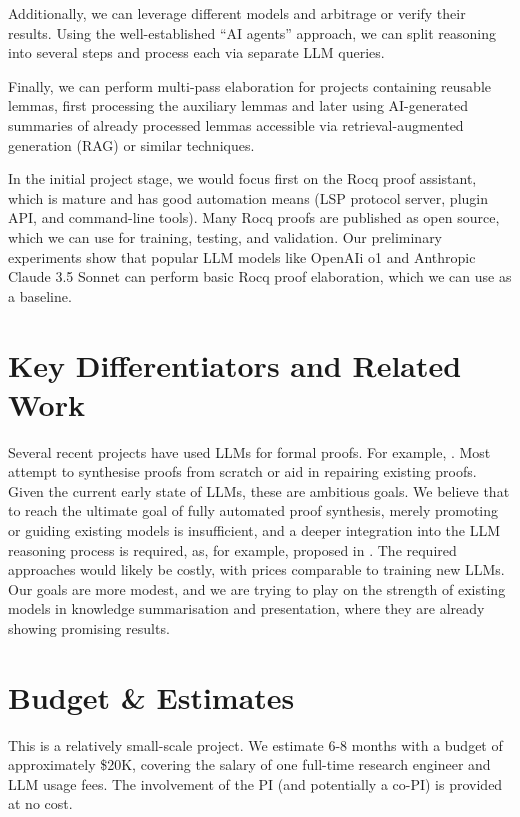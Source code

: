 \documentclass[10pt,nonacm,natbib=false]{acmart}
\begin{document}
Additionally, we can leverage different models and arbitrage or verify
their results. Using the well-established “AI agents” approach, we can
split reasoning into several steps and process each via separate LLM
queries.

Finally, we can perform multi-pass elaboration for projects containing
reusable lemmas, first processing the auxiliary lemmas and later using
AI-generated summaries of already processed lemmas accessible via
retrieval-augmented generation (RAG) or similar techniques.

In the initial project stage, we would focus first on the Rocq proof
assistant, which is mature and has good automation means (LSP protocol
server, plugin API, and command-line tools). Many Rocq proofs are
published as open source, which we can use for training, testing, and
validation. Our preliminary experiments show that popular LLM models
like OpenAIi o1 and Anthropic Claude 3.5 Sonnet can perform basic Rocq
proof elaboration, which we can use as a baseline.

\section*{Key Differentiators and Related Work}

Several recent projects have used LLMs for formal proofs. For example,
\cite{DBLP:journals/corr/abs-2409-14274,
  DBLP:journals/corr/abs-2205-12615,
  DBLP:journals/corr/abs-1905-09381,DBLP:journals/corr/abs-2410-19605,
  DBLP:journals/corr/abs-2306-15626,
  DBLP:journals/corr/abs-2407-03203}.  Most attempt to synthesise
proofs from scratch or aid in repairing existing proofs. Given the
current early state of LLMs, these are ambitious goals. We believe
that to reach the ultimate goal of fully automated proof synthesis,
merely promoting or guiding existing models is insufficient, and a
deeper integration into the LLM reasoning process is required, as, for
example, proposed in \cite{park2024grammaraligneddecoding}. The
required approaches would likely be costly, with prices comparable to
training new LLMs. Our goals are more modest, and we are trying to
play on the strength of existing models in knowledge summarisation and
presentation, where they are already showing promising results.

\section*{Budget \& Estimates}

This is a relatively small-scale project. We estimate 6-8 months with
a budget of approximately \$20K, covering the salary of one full-time
research engineer and LLM usage fees. The involvement of the PI (and
potentially a co-PI) is provided at no cost.
\end{document}
